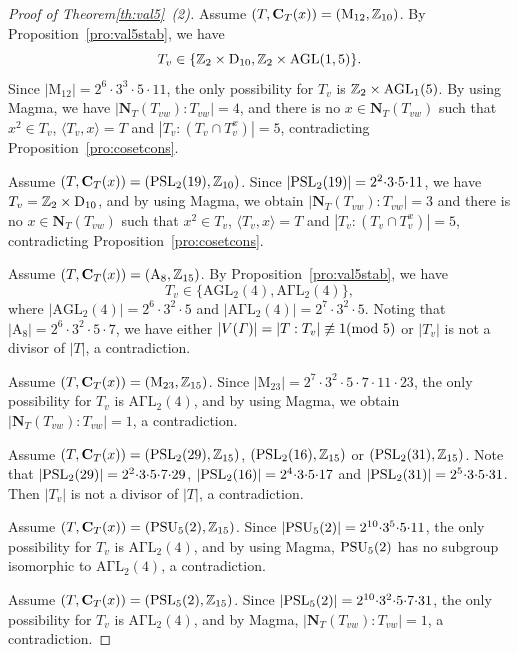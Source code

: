 \documentclass[12pt,reqno]{amsart}
\newcommand\A{\mathrm{A}} \newcommand\AGL{\mathrm{AGL}} \newcommand\AGammaL{\mathrm{A\Gamma L}} \newcommand\Alt{\mathrm{Alt}} \newcommand\ASL{\mathrm{ASL}} \newcommand\ASigmaL{\mathrm{A \Sigma L}} \newcommand\Aut{\mathrm{Aut}}
\def\C{\mathbf{C}}   \newcommand\Cay{\mathrm{Cay}}   \newcommand\Cos{\mathrm{Cos}} \newcommand{\CGammaSp}{\mathrm{C\Gamma Sp}}
\newcommand\D{\mathrm{D}}   \def\det{{\sf det}}
\newcommand\M{\mathrm{M}} \newcommand{\magma}{{\sc Magma}} \renewcommand \mod{{\rm mod~}}
\newcommand\N{\mathbf{N}}
\numberwithin {equation} {section}
\begin{document}
\begin{proof}[Proof of Theorem\ref{th:val5}~{\rm(2)}]
Assume $(T,\C_T(x))=(\M_{12}, \ZZ_{10})$.  By Proposition~\ref{pro:val5stab}, we have
\[ T_v \in\{\ZZ_2\times \D_{10}, \ZZ_2\times\AGL(1,5)\}.\]
Since $|\M_{12}|=2^6{\cdot}3^3{\cdot}5{\cdot}11$, the only possibility for $ T_v $ is $\ZZ_2 \times\AGL_1(5)$. By using {\sc Magma}, we have $|\N_T(T_{vw}):T_{vw}|=4$, and there is no $x\in \N_T(T_{vw})$ such that $x^2 \in T_v$, $\langle T_v,x\rangle=T$ and $|T_v:(T_v \cap T_v^x)|=5$, contradicting Proposition~\ref{pro:cosetcons}.

Assume $(T,\C_T(x))=(\PSL_2(19), \ZZ_{10})$. Since $|\mathrm{PSL}_2(19)|=2^2{\cdot}3{\cdot}5{\cdot}11$, we have $ T_v =\ZZ_2 \times \D_{10}$, and by using {\sc Magma}, we obtain $|\N_T(T_{vw}):T_{vw}|=3$ and there is no $x \in \N_T(T_{vw}) $ such that  $x^2 \in T_v$, $\langle T_v,x\rangle=T$ and $|T_v:(T_v \cap T_v^x)|=5$, contradicting Proposition~\ref{pro:cosetcons}.

Assume $(T,\C_T(x))=(\A_8,\ZZ_{15})$. By Proposition~\ref{pro:val5stab}, we have \[T_v\in \{ \AGL_2(4),\AGammaL_2(4)\},\]
 where  $|\AGL_2(4)|=2^6{\cdot}3^2{\cdot}5$  and  $|\AGammaL_2(4)|=2^7{\cdot}3^2{\cdot}5 $.
Noting that $|\A_8|=2^6 {\cdot} 3^2 {\cdot} 5 {\cdot} 7$, we have either $|V(\Ga)|= |T:T_v|\not\equiv 1 (\mod 5)$ or $|T_v|$ is not a divisor of $|T|$, a contradiction.

Assume $(T,\C_T(x))=(\M_{23}, \ZZ_{15})$. Since $|\M_{23}|=2^7{\cdot}3^2 {\cdot}5{\cdot}7 {\cdot}11{\cdot}23$, the only possibility for  $ T_v $ is $\AGammaL_2(4) $, and by using {\sc Magma}, we obtain $|\N_T(T_{vw}):T_{vw}|=1$, a contradiction.

Assume $(T,\C_T(x))=(\PSL_2(29), \ZZ_{15})$, $(\mathrm{PSL}_2(16), \mathbb{Z}_{15})$ or $(\mathrm{PSL}_2(31), \mathbb{Z}_{15})$. Note that $|\mathrm{PSL}_2(29)|=2^2 {\cdot} 3 {\cdot}  5 {\cdot}  7 {\cdot} 29$, $|\mathrm{PSL}_2(16)|=2^4{\cdot}  3{\cdot}  5{\cdot}  17$ and $|\mathrm{PSL}_2(31)|=2^5{\cdot} 3{\cdot} 5{\cdot} 31$. Then $|T_v|$ is not a divisor of $|T|$, a contradiction.




Assume $(T,\C_T(x))=(\PSU_5(2), \ZZ_{15})$. Since $|\mathrm{PSU}_5(2)|=2^{10}{\cdot}3^5{\cdot}5{\cdot}11$, the only possibility for  $ T_v $ is $\AGammaL_2(4)$, and by using {\sc Magma}, $\mathrm{PSU}_5(2)$ has no subgroup isomorphic to $\AGammaL_2(4)$, a contradiction.

Assume $(T,\C_T(x))=(\PSL_5(2), \ZZ_{15})$. Since $|\mathrm{PSL}_5(2)|=2^{10}{\cdot}3^2{\cdot}5{\cdot}7{\cdot} 31$, the only possibility for  $ T_v $ is $\AGammaL_2(4)$, and by {\sc Magma},  $|\N_T(T_{vw}):T_{vw}|=1$, a contradiction.



\end{proof}
\end{document}
